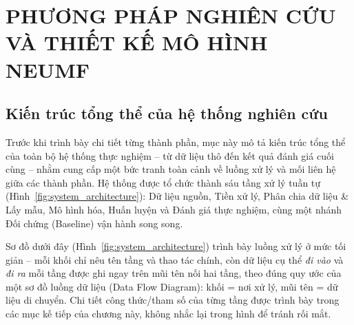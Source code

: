 \chapter{PHƯƠNG PHÁP NGHIÊN CỨU VÀ THIẾT KẾ MÔ HÌNH NEUMF}
\label{chap:thietke_trienkhai}

\section{Kiến trúc tổng thể của hệ thống nghiên cứu}
\label{sec:system_architecture}

Trước khi trình bày chi tiết từng thành phần, mục này mô tả kiến trúc tổng thể của toàn bộ hệ thống thực nghiệm -- từ dữ liệu thô đến kết quả đánh giá cuối cùng -- nhằm cung cấp một bức tranh toàn cảnh về luồng xử lý và mối liên hệ giữa các thành phần. Hệ thống được tổ chức thành sáu tầng xử lý tuần tự (Hình~\ref{fig:system_architecture}): Dữ liệu nguồn, Tiền xử lý, Phân chia dữ liệu \& Lấy mẫu, Mô hình hóa, Huấn luyện và Đánh giá thực nghiệm, cùng một nhánh Đối chứng (Baseline) vận hành song song.

Sơ đồ dưới đây (Hình~\ref{fig:system_architecture}) trình bày luồng xử lý ở mức tối giản -- mỗi khối chỉ nêu tên tầng và thao tác chính, còn dữ liệu cụ thể \emph{đi vào} và \emph{đi ra} mỗi tầng được ghi ngay trên mũi tên nối hai tầng, theo đúng quy ước của một sơ đồ luồng dữ liệu (Data Flow Diagram): khối = nơi xử lý, mũi tên = dữ liệu di chuyển. Chi tiết công thức/tham số của từng tầng được trình bày trong các mục kế tiếp của chương này, không nhắc lại trong hình để tránh rối mắt.

